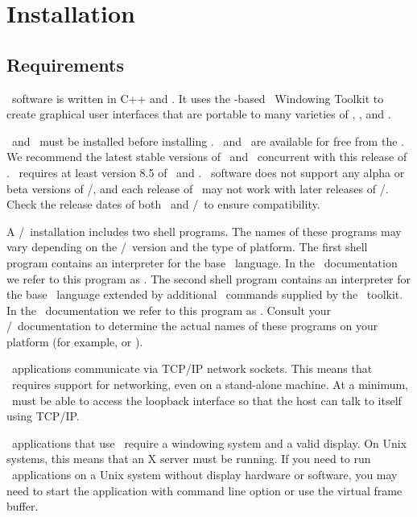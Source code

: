 \section{Installation}\label{sec:install}

\subsection{Requirements}\label{sec:install.requirements}
\OOMMF\ software is written in C++ and \Tcl.  It uses the \Tcl-based
\Tk\ Windowing Toolkit to create graphical user interfaces that are
portable to many varieties of \Unix, \Windows, and \MacOSX.  

\Tcl\ and \Tk\ must be installed before installing \OOMMF.  
\Tcl\ and \Tk\ are available for free from the
.
We recommend the latest stable 
versions of \Tcl\ and \Tk\ concurrent with this release of \OOMMF.
\OOMMF\ requires
at least version 8.5 of \Tcl\ and \Tk.  \OOMMF\ software 
does not support any alpha or beta versions of \Tcl/\Tk, and 
each release of \OOMMF\ may not work with later releases of
\Tcl/\Tk.  Check the release dates of both \OOMMF\ and
\Tcl/\Tk\ to ensure compatibility.

A \Tcl/\Tk\ installation includes two shell programs.  The names of 
these programs may vary depending on the \Tcl/\Tk\ version and the 
type of platform.  The first shell program contains an interpreter 
for the base \Tcl\ language.  In the \OOMMF\ documentation we refer 
to this program as .  
The second shell program contains 
an interpreter for the base \Tcl\ language extended by additional
\Tcl\ commands supplied by the \Tk\ toolkit.  In the 
\OOMMF\ documentation we refer to this program as 
.  
Consult your \Tcl/\Tk\ documentation to determine 
the actual names of these programs on your platform (for example, 
 or ).

\OOMMF\ applications communicate via TCP/IP network sockets.
This means that \OOMMF\ requires
support for networking, even 
on a stand-alone machine.  At a minimum, \OOMMF\ must be able to 
access the loopback interface so that the host can talk to 
itself using TCP/IP.

\OOMMF\ applications that use \Tk\ require a windowing system and
a valid display.  On Unix systems, this means that an X server must
be running.  If you need to run \OOMMF\ applications on a Unix system
without display hardware or software, you may need to start the 
application with command line option 
or use the
virtual frame buffer.

